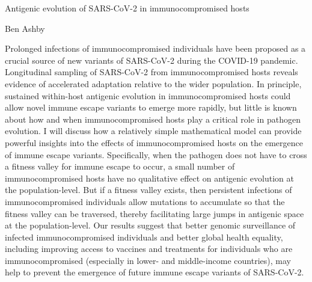 
Antigenic evolution of SARS-CoV-2 in immunocompromised hosts

Ben Ashby

Prolonged infections of immunocompromised individuals have been proposed as a
crucial source of new variants of SARS-CoV-2 during the COVID-19 pandemic.
Longitudinal sampling of SARS-CoV-2 from immunocompromised hosts reveals
evidence of accelerated adaptation relative to the wider population. In
principle, sustained within-host antigenic evolution in immunocompromised hosts
could allow novel immune escape variants to emerge more rapidly, but little is
known about how and when immunocompromised hosts play a critical role in
pathogen evolution. I will discuss how a relatively simple mathematical model
can provide powerful insights into the effects of immunocompromised hosts on the
emergence of immune escape variants. Specifically, when the pathogen does not
have to cross a fitness valley for immune escape to occur, a small number of
immunocompromised hosts have no qualitative effect on antigenic evolution at the
population-level. But if a fitness valley exists, then persistent infections of
immunocompromised individuals allow mutations to accumulate so that the fitness
valley can be traversed, thereby facilitating large jumps in antigenic space at
the population-level. Our results suggest that better genomic surveillance of
infected immunocompromised individuals and better global health equality,
including improving access to vaccines and treatments for individuals who are
immunocompromised (especially in lower- and middle-income countries), may help
to prevent the emergence of future immune escape variants of SARS-CoV-2.

